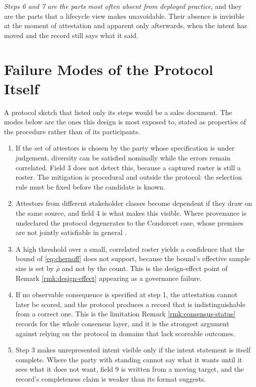 \emph{Steps 6 and 7 are the parts most often absent from deployed practice}, and they are the parts
that a lifecycle view makes unavoidable. Their absence is invisible at the moment of attestation and
apparent only afterwards, when the intent has moved and the record still says what it said.

\section{Failure Modes of the Protocol Itself}

A protocol sketch that listed only its steps would be a sales document. The modes below are the ones
this design is most exposed to, stated as properties of the procedure rather than of its
participants.

\begin{enumerate}[label=(\alph*)]
\item {} If the set of attestors is chosen by the party whose specification
      is under judgement, diversity can be satisfied nominally while the errors remain correlated.
      Field 3 does not detect this, because a captured roster is still a roster. The mitigation is
      procedural and outside the protocol: the selection rule must be fixed before the candidate is
      known.
\item {} Attestors from different stakeholder classes become dependent if
      they draw on the same source, and field 4 is what makes this visible. Where provenance is
      undeclared the protocol degenerates to the Condorcet case, whose premises are not jointly
      satisfiable in general \cite{dietrich2008}.
\item {} A high threshold over a small, correlated roster yields a
      confidence that the bound of \eqref{eq:chernoff} does not support, because the bound's
      effective sample size is set by $\bar\rho$ and not by the count. This is the design-effect
      point of Remark \ref{rmk:design-effect} appearing as a governance failure.
\item {} If no observable consequence is specified at step 1, the
      attestation cannot later be scored, and the protocol produces a record that is
      indistinguishable from a correct one. This is the limitation Remark
      \ref{rmk:consensus-status} records for the whole consensus layer, and it is the strongest
      argument against relying on the protocol in domains that lack scoreable outcomes.
\item {} Step 3 makes unrepresented intent visible only if the intent
      statement is itself complete. Where the party with standing cannot say what it wants until it
      sees what it does not want, field 9 is written from a moving target, and the record's
      completeness claim is weaker than its format suggests.
\end{enumerate}

